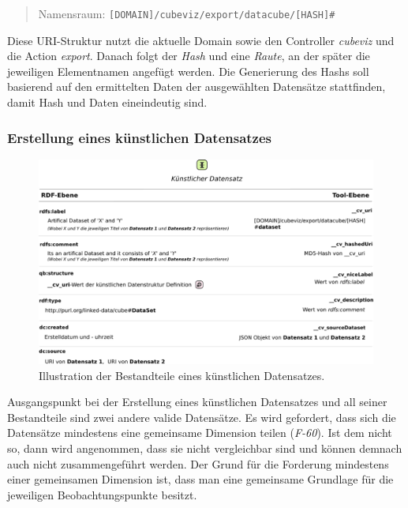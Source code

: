 \documentclass[11pt]{article}
\newcommand{\com}[1]{\marginpar{\em {\small{#1}}}} %
\begin{document}
\begin{quote}
	Namensraum: \verb|[DOMAIN]/cubeviz/export/datacube/[HASH]#|
\end{quote}

Diese URI-Struktur nutzt die aktuelle Domain sowie den Controller \emph{cubeviz} und die Action \emph{export}. Danach folgt der \emph{Hash} und eine \emph{Raute}, an der später die jeweiligen Elementnamen angefügt werden. Die Generierung des Hashs soll basierend auf den ermittelten Daten der ausgewählten Datensätze stattfinden, damit Hash und Daten eineindeutig sind.

%
%
\subsubsection{Erstellung eines künstlichen Datensatzes}

%
%
\begin{figure}[h!]
    \centering
    \includegraphics[width=15cm]{MergedDataCube/Dataset.pdf}
    \caption{Illustration der Bestandteile eines künstlichen Datensatzes.}
    \label{fig:MergedDataCube_Dataset}
\end{figure}

\noindent
Ausgangspunkt bei der Erstellung eines künstlichen Datensatzes und all seiner Bestandteile sind zwei andere valide Datensätze. \com{Anforderung \\ F-60, S. \pageref{req:F60}}Es wird gefordert, dass sich die Datensätze mindestens eine gemeinsame Dimension teilen (\textit{F-60})\label{req:F60source}. Ist dem nicht so, dann wird angenommen, dass sie nicht vergleichbar sind und können demnach auch nicht zusammengeführt werden. Der Grund für die Forderung mindestens einer gemeinsamen Dimension ist, dass man eine gemeinsame Grundlage für die jeweiligen Beobachtungspunkte besitzt. 
\end{document}
